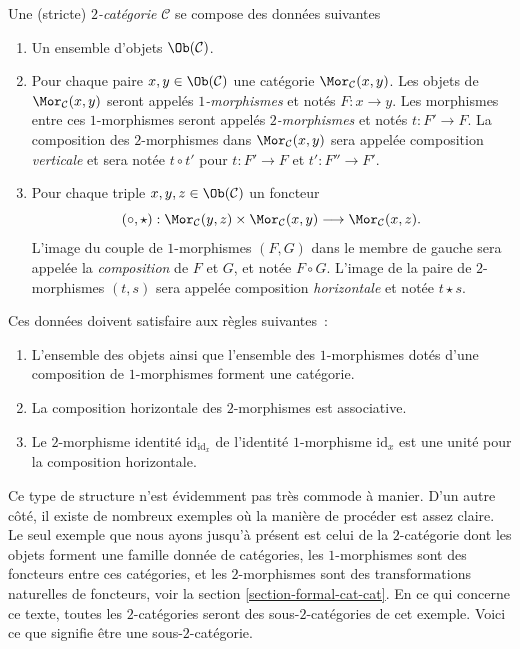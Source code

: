 \begin{definition}
\label{definition-2-category}
Une (stricte) {\it $2$-catégorie} $\mathcal{C}$ se compose des données suivantes
\begin{enumerate}
\item Un ensemble d'objets $\Ob(\mathcal{C})$.
\item Pour chaque paire $x, y \in \Ob(\mathcal{C})$ une catégorie
$\Mor_\mathcal{C}(x, y)$. Les objets de $\Mor_\mathcal{C}(x, y)$ seront
appelés {\it $1$-morphismes} et notés $F : x \to y$. Les morphismes entre ces
$1$-morphismes seront appelés {\it $2$-morphismes} et notés $t : F' \to F$. La
composition des $2$-morphismes dans $\Mor_\mathcal{C}(x, y)$ sera appelée
composition {\it verticale} et sera notée $t \circ t'$ pour $t : F' \to F$ et
$t' : F'' \to F'$.
\item Pour chaque triple $x, y, z\in \Ob(\mathcal{C})$ un foncteur
$$
(\circ, \star) :
\Mor_\mathcal{C}(y, z) \times \Mor_\mathcal{C}(x, y)
\longrightarrow
\Mor_\mathcal{C}(x, z).
$$
L'image du couple de $1$-morphismes $(F, G)$ dans le membre de gauche sera appelée
la {\it composition} de $F$ et $G$, et notée $F\circ G$. L'image de la paire
de $2$-morphismes $(t, s)$ sera appelée composition {\it horizontale} et notée
$t \star s$.
\end{enumerate}
Ces données doivent satisfaire aux règles suivantes :
\begin{enumerate}
\item L'ensemble des objets ainsi que l'ensemble des $1$-morphismes dotés
d'une composition de $1$-morphismes forment une catégorie.
\item La composition horizontale des $2$-morphismes est associative.
\item Le $2$-morphisme identité $\text{id}_{\text{id}_x}$ de l'identité
$1$-morphisme $\text{id}_x$ est une unité pour la composition horizontale.
\end{enumerate}
\end{definition}

\noindent
Ce type de structure n'est évidemment pas très commode à manier. D’un autre
côté, il existe de nombreux exemples où la manière de procéder est
assez claire. Le seul exemple que nous ayons jusqu'à présent est
celui de la $2$-catégorie dont les objets forment une famille donnée de
catégories, les $1$-morphismes sont des foncteurs entre ces catégories, et les
$2$-morphismes sont des transformations naturelles de foncteurs, voir la
section \ref{section-formal-cat-cat}. En ce qui concerne ce texte, toutes les
$2$-catégories seront des sous-$2$-catégories de cet exemple. Voici ce que
signifie être une sous-$2$-catégorie.

